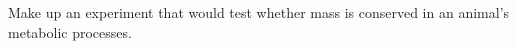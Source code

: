 Make up an experiment that would test whether mass is conserved in an
        animal's metabolic processes.
